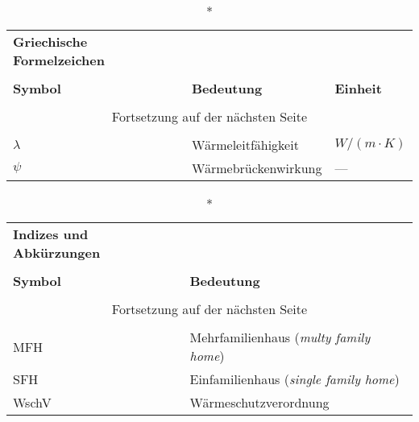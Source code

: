\begin{onehalfspacing}
\begin{longtable}[h]{p{} p{} p{}}
		
\end{longtable}

\begin{longtable}[h]{p{} p{} p{}}
		\caption*{\textbf{Griechische Formelzeichen}} \\
		\\
		\textbf{Symbol} & \textbf{Bedeutung} & \textbf{Einheit} \\ %
		\endhead
		\\
		\multicolumn{3}{c}{Fortsetzung auf der nächsten Seite} \\
		\endfoot
		\multicolumn{3}{c}{ } \\
		\endlastfoot
		
		$\lambda$ & Wärmeleitfähigkeit & \(W/(m \cdot K) \)\\
		$\psi$ & Wärmebrückenwirkung & ---\\
		
		
\end{longtable}

\begin{longtable}[h]{p{} p{}}
		\caption*{\textbf{Indizes und Abkürzungen}} \\
		\\
		\textbf{Symbol} & \textbf{Bedeutung} \\ %
		\endhead
		\\
		\multicolumn{2}{c}{Fortsetzung auf der nächsten Seite} \\
		\endfoot
		\multicolumn{2}{c}{ } \\
		\endlastfoot
		
		
		
		MFH & Mehrfamilienhaus (\emph{multy family home})\\
		SFH & Einfamilienhaus (\emph{single family home})\\
		WschV & Wärmeschutzverordnung
		

\end{longtable}
\end{onehalfspacing}
